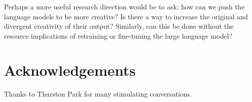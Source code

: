 \documentclass{article}
\begin{document}
Perhaps a more useful research direction would be to ask: how can we push the language models to be more creative? Is there a way to increase the original and divergent creativity of their output? Similarly, can this be done without the resource implications of retraining or fine-tuning the large language model?





\section*{Acknowledgements}
Thanks to Thurston Park for many stimulating conversations.

%  
  
\end{document}
